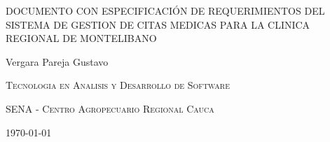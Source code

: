 \documentclass{article}
\author{Gustavo Vergara}
\theoremstyle{mytheoremstyle}
\theoremstyle{mytheoremstyle}
\theoremstyle{myproblemstyle}
\begin{document}
\begin{titlepage}
    \centering
    
    
    \vspace{3cm}
    {\scshape\large DOCUMENTO CON ESPECIFICACIÓN DE REQUERIMIENTOS DEL SISTEMA DE GESTION DE CITAS MEDICAS PARA LA CLINICA REGIONAL DE MONTELIBANO \par}
    \vspace{7cm}
    \textbf\large\scshape{\par}
         \vspace{0.5cm}
         
    {\Large Vergara Pareja Gustavo\par}
    \vspace{7cm}
    {\scshape\Large Tecnologia en Analisis y Desarrollo de Software \par}
    \vspace{1cm}
    {\scshape\Large SENA - Centro Agropecuario Regional Cauca\par}
    \vspace{1cm}
    {\Large \today \par}
    \end{titlepage}

\tableofcontents

\newpage
\end{document}
